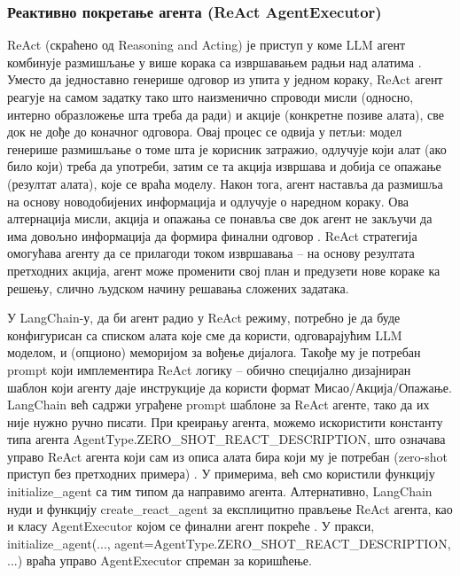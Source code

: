 \subsubsection{Реактивно покретање агента (ReAct AgentExecutor)}

ReAct (скраћено од Reasoning and Acting) је приступ у коме LLM агент комбинује размишљање у више корака са извршавањем радњи над алатима \cite{langchain_docs_2024}. Уместо да једноставно генерише одговор из упита у једном кораку, ReAct агент реагује на самом задатку тако што наизменично спроводи мисли (односно, интерно образложење шта треба да ради) и акције (конкретне позиве алата), све док не дође до коначног одговора. Овај процес се одвија у петљи: модел генерише размишљање о томе шта је корисник затражио, одлучује који алат (ако било који) треба да употреби, затим се та акција извршава и добија се опажање (резултат алата), које се враћа моделу. Након тога, агент наставља да размишља на основу новодобијених информација и одлучује о наредном кораку. Ова алтернација мисли, акција и опажања се понавља све док агент не закључи да има довољно информација да формира финални одговор \cite{langchain_docs_2024}. ReAct стратегија омогућава агенту да се прилагоди током извршавања -- на основу резултата претходних акција, агент може променити свој план и предузети нове кораке ка решењу, слично људском начину решавања сложених задатака.

У LangChain-у, да би агент радио у ReAct режиму, потребно је да буде конфигурисан са списком алата које сме да користи, одговарајућим LLM моделом, и (опционо) меморијом за вођење дијалога. Такође му је потребан prompt који имплементира ReAct логику -- обично специјално дизајниран шаблон који агенту даје инструкције да користи формат Мисао/Акција/Опажање. LangChain већ садржи уграђене prompt шаблоне за ReAct агенте, тако да их није нужно ручно писати. При креирању агента, можемо искористити константу типа агента AgentType.ZERO\_SHOT\_REACT\_DESCRIPTION, што означава управо ReAct агента који сам из описа алата бира који му је потребан (zero-shot приступ без претходних примера) \cite{langchain_docs_2024}. У примерима, већ смо користили функцију initialize\_agent са тим типом да направимо агента. Алтернативно, LangChain нуди и функцију create\_react\_agent за експлицитно прављење ReAct агента, као и класу AgentExecutor којом се финални агент покреће \cite{langchain_docs_2024}. У пракси, initialize\_agent(..., agent=AgentType.ZERO\_SHOT\_REACT\_DESCRIPTION, ...) враћа управо AgentExecutor спреман за коришћење.


